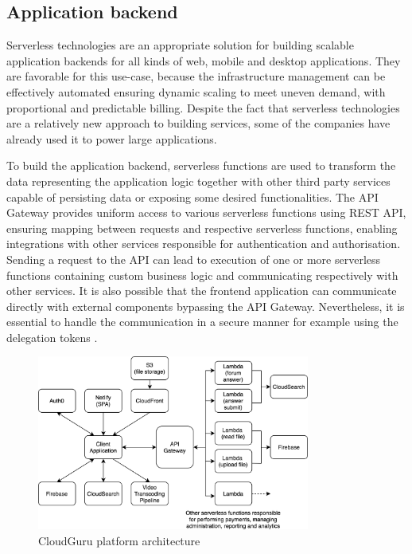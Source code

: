 \subsection{Application backend}


Serverless technologies are an appropriate solution for building scalable application backends for all kinds of web, mobile and desktop applications. They are favorable for this use-case, because the infrastructure management can be effectively automated ensuring dynamic scaling to meet uneven demand, with proportional and predictable billing. Despite the fact that serverless technologies are a relatively new approach to building services, some of the companies have already used it to power large applications.

To build the application backend, serverless functions are used to transform the data representing the application logic together with other third party services capable of persisting data or exposing some desired functionalities. The API Gateway provides uniform access to various serverless functions using REST API, ensuring mapping between requests and respective serverless functions, enabling integrations with other services responsible for authentication and authorisation. Sending a request to the API can lead to execution of one or more serverless functions containing custom business logic and communicating respectively with other services. It is also possible that the frontend application can communicate directly with external components bypassing the API Gateway. Nevertheless, it is essential to handle the communication in a secure manner for example using the delegation tokens \cite{ServerlessArchitectureOnAWS}.

\begin{figure}[h]
    \centering
    \includegraphics[width=0.8\textwidth]{assets/02-serverless/CloudGuruArchitecture.png}
    \caption{CloudGuru platform architecture}
    \label{fig:cloudguru-architecture-diagram}
\end{figure}

